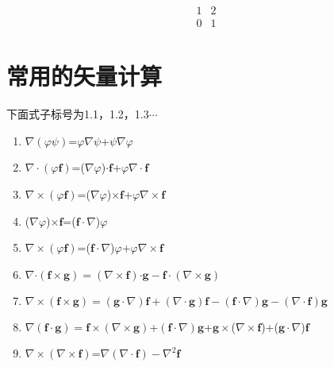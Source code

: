 \documentclass[UTF8]{ctexart}
\newcommand{\tmmathbf}[1]{\ensuremath{\boldsymbol{#1}}}
\newcommand{\tmtextbf}[1]{{\bfseries{#1}}}
\begin{document}
\[
\begin{array}{c|c}
1 & 2\\
\hline
0　& 1
\end{array}
\]

\section{常用的矢量计算}

下面式子标号为1.1，1.2，1.3$\cdots$
\begin{enumerate}
  
  \item $\nabla (\varphi \psi)$=$\varphi \nabla \psi$+$\psi \nabla \varphi$
  
  \item $\nabla \cdot (\varphi \tmmathbf{f})$=($\nabla \varphi$)$\cdot
  \tmmathbf{f}$+$\varphi \nabla \cdot \tmmathbf{f}$
  
  \item $\nabla \times (\varphi \tmmathbf{f})$=($\nabla \varphi$)$\times
  \tmmathbf{f}$+$\varphi \nabla \times \tmmathbf{f}$
  
  \item ($\nabla \varphi$)$\times \tmmathbf{f}$=(\tmtextbf{$\tmmathbf{f
  \cdot}$}$\nabla$)$\varphi$
  
  \item $\nabla \times (\varphi \tmmathbf{f})$=(\tmtextbf{$\tmmathbf{f
  \cdot}$}$\nabla$)$\varphi$+$\varphi \nabla \times \tmmathbf{f}$
  
  \item $\nabla \tmmathbf{\cdot} (\tmmathbf{f \times g}) = (\nabla \times
  \tmmathbf{f}) \tmmathbf{\cdot} \tmmathbf{g} - \tmmathbf{f \cdot} (\nabla
  \times \tmmathbf{g})$
  
  \item $\nabla \times (\tmmathbf{f \times} \tmmathbf{g}) = (\tmmathbf{g
  \cdot} \nabla) \tmmathbf{f} + (\nabla \cdot \tmmathbf{g}) \tmmathbf{f} -
  (\tmmathbf{f \cdot} \nabla) \tmmathbf{g} - (\nabla \cdot \tmmathbf{f})
  \tmmathbf{g}$
  
  \item $\nabla (\tmmathbf{f \cdot} \tmmathbf{g}) = \tmmathbf{f} \times
  (\nabla \times \tmmathbf{g})$+$(\tmmathbf{f \cdot} \nabla)
  \tmmathbf{g}$+\tmtextbf{$\tmmathbf{g \times}$}($\nabla \times
  \tmmathbf{f}$)+($\tmmathbf{g \cdot} \nabla$)$\tmmathbf{f}$
  
  \item $\nabla \times (\nabla \times \tmmathbf{f})$=$\nabla (\nabla \cdot
  \tmmathbf{f}) - \nabla^2 \tmmathbf{f}$
  

\end{enumerate}
\end{document}
